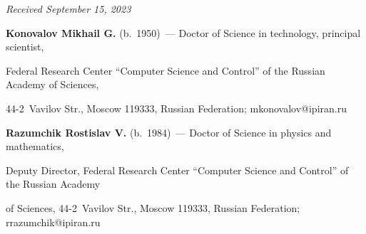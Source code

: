\vspace*{-6pt}





\hfill{\small\textit{Received September 15, 2023}} 





\vspace*{-14pt} 





\Contr





\vspace*{-3pt}





\noindent


\textbf{Konovalov Mikhail G.} (b.\ 1950)~--- Doctor of Science in technology, principal scientist, 


Federal Research Center ``Computer Science and Control'' of the Russian Academy of Sciences,  


44-2~Vavilov Str., Moscow 119333, Russian Federation; \mbox{mkonovalov@ipiran.ru}





\vspace*{3pt}








\noindent


\textbf{Razumchik Rostislav V.} (b.\ 1984)~--- Doctor of Science in physics and mathematics, 


Deputy Director, Federal Research Center ``Computer Science and Control'' of the Russian Academy 


of Sciences, 44-2~Vavilov Str., Moscow 119333, Russian Federation; \mbox{rrazumchik@ipiran.ru}











\label{end\stat}





\renewcommand{\bibname}{\protect\rm Литература}    


